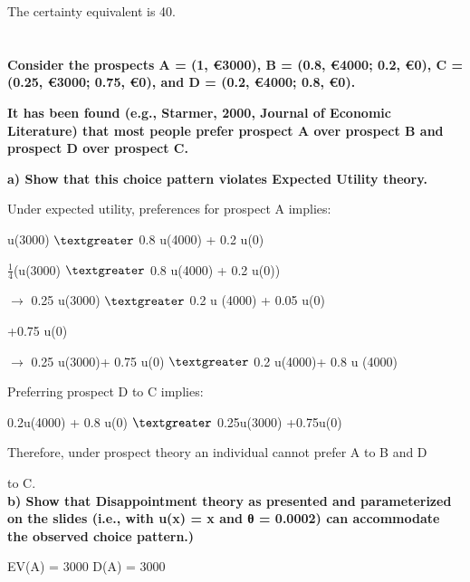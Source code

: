 \documentclass{article}
\begin{document}
The	certainty	equivalent	is	40.

\section{}
\textbf{Consider the prospects A = (1, €3000), B = (0.8, €4000; 0.2, €0), \linebreak C = (0.25, €3000; 0.75, €0), and D = (0.2, €4000; 0.8, €0). \linebreak}
	  
\textbf{It has been found (e.g., Starmer, 2000, Journal of Economic Literature) that most people prefer prospect A over prospect B and prospect D over prospect C.} 
	  
	 \vspace{2mm} 
	  
\textbf{ a) Show that this choice pattern violates Expected Utility theory.} 
 
  \vspace{2mm}
 
 Under expected utility, preferences for prospect A implies: 
 
 u(3000) $\textgreater$ 0.8 u(4000) + 0.2 u(0)
 
 $\frac{1}{4}$(u(3000) $\textgreater$ 0.8 u(4000) + 0.2 u(0))
  
 $\rightarrow$ 0.25 u(3000) $\textgreater$ 0.2 u (4000) + 0.05 u(0)
    
			    +0.75 u(0)
    
 $\rightarrow$ 0.25 u(3000)+ 0.75 u(0) $\textgreater$ 0.2 u(4000)+ 0.8 u (4000)
 
 \vspace{2mm}
 
 Preferring prospect D to C implies: 
 
 0.2u(4000) + 0.8 u(0) $\textgreater$ 0.25u(3000) +0.75u(0)
  
   \vspace{2mm}
  
 Therefore, under prospect theory an individual cannot prefer A to B and D 
 
 to C. \\
 
\textbf{ b) Show that Disappointment theory as presented and parameterized on the slides
(i.e., with u(x) = x and θ = 0.0002) can accommodate the observed choice pattern.)} 
  
  \vspace{2mm}
  
  EV(A) = 3000		D(A) = 3000		
  
\end{document}
